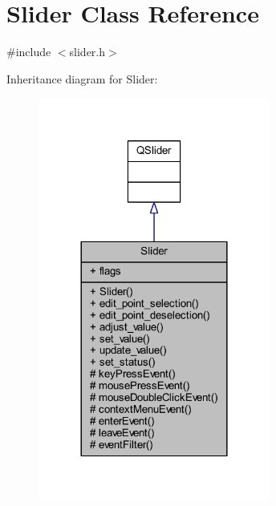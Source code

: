 \hypertarget{a00077}{\section{Slider Class Reference}
\label{a00077}
}


{\ttfamily \#include $<$slider.\+h$>$}



Inheritance diagram for Slider\+:
\nopagebreak
\begin{figure}[H]
\begin{center}
\leavevmode
\includegraphics[width=216pt]{d2/d50/a00561}
\end{center}
\end{figure}


